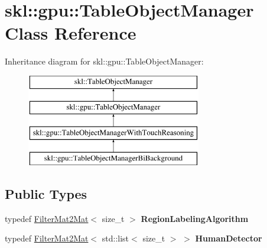 \hypertarget{classskl_1_1gpu_1_1_table_object_manager}{}\section{skl\+:\+:gpu\+:\+:Table\+Object\+Manager Class Reference}
\label{classskl_1_1gpu_1_1_table_object_manager}
Inheritance diagram for skl\+:\+:gpu\+:\+:Table\+Object\+Manager\+:\begin{figure}[H]
\begin{center}
\leavevmode
\includegraphics[height=4.000000cm]{classskl_1_1gpu_1_1_table_object_manager}
\end{center}
\end{figure}
\subsection*{Public Types}
\begin{DoxyCompactItemize}
\item 
\hypertarget{classskl_1_1gpu_1_1_table_object_manager_a75b519bccc987044293a735eef7f28af}{}\label{classskl_1_1gpu_1_1_table_object_manager_a75b519bccc987044293a735eef7f28af} 
typedef \hyperlink{classskl_1_1_filter_mat2_mat}{Filter\+Mat2\+Mat}$<$ size\+\_\+t $>$ {\bfseries Region\+Labeling\+Algorithm}
\item 
\hypertarget{classskl_1_1gpu_1_1_table_object_manager_a2baac34bf45c2953749a6c4bc283365a}{}\label{classskl_1_1gpu_1_1_table_object_manager_a2baac34bf45c2953749a6c4bc283365a} 
typedef \hyperlink{classskl_1_1_filter_mat2_mat}{Filter\+Mat2\+Mat}$<$ std\+::list$<$ size\+\_\+t $>$ $>$ {\bfseries Human\+Detector}
\end{DoxyCompactItemize}
